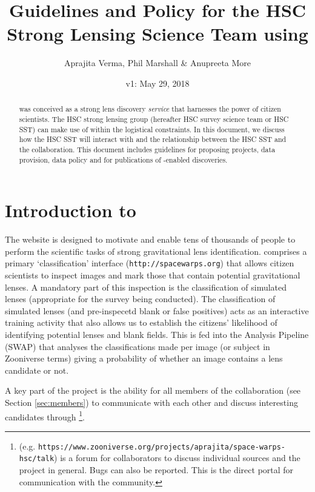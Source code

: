 \documentclass[a4paper,twocolumn]{article}
\begin{document}
             
\title{Guidelines and Policy for the HSC Strong Lensing Science Team using \SW}
\author{Aprajita Verma, Phil Marshall \& Anupreeta More}
\date{v1: May 29, 2018}
\maketitle


\begin{abstract} 
\noindent \SW was conceived as a strong lens discovery {\it service}
that harnesses the power of citizen scientists. The HSC strong
lensing group (hereafter HSC survey science team or HSC SST) can
make use of \SW within the logistical constraints. In this document,
we discuss how the HSC SST will interact with \SW and the
relationship between the HSC SST and the \SW collaboration.  This
document includes guidelines for proposing projects, data provision,
data policy and for publications of \SW-enabled discoveries.
\end{abstract}

\setcounter{footnote}{0}


\section{Introduction to \sw}

The \SW website is designed to motivate and enable tens of thousands
of people to perform the scientific tasks of strong gravitational lens
identification.  \SW comprises a primary `classification' interface
(\texttt{http://spacewarps.org}) that allows citizen scientists to
inspect images and mark those that contain potential gravitational
lenses. A mandatory part of this inspection is the classification of
simulated lenses (appropriate for the survey being conducted). The
classification of simulated lenses (and pre-inspecetd blank or false positives) acts as an interactive training
activity that also allows us to establish the citizens' likelihood of
identifying potential lenses and blank fields. This is fed into the
\SW Analysis Pipeline (SWAP) that analyses the classifications made
per image (or subject in Zooniverse terms) giving a probability of
whether an image contains a lens candidate or not.

A key part of the \SW project is the ability for all members of the
\SW collaboration (see Section \ref{sec:members}) to communicate with
each other and discuss interesting candidates through
\Talk\footnote{\Talk (e.g. \texttt{https://www.zooniverse.org/projects/aprajita/space-warps-hsc/talk}) is
  a forum for \SW collaborators to discuss individual sources and the
  \SW project in general. Bugs can also be reported. This is the
  direct portal for communication with the \SW community.}.
\end{document}
